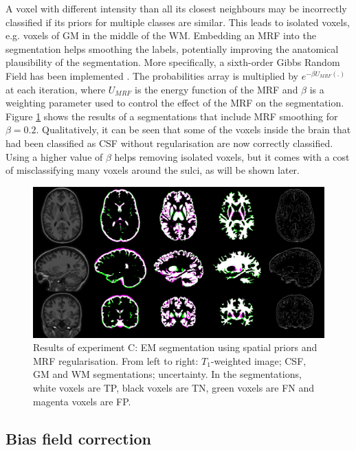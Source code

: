 A voxel with different intensity than all its closest neighbours may be incorrectly classified if its priors for multiple classes are similar. This leads to isolated voxels, e.g. voxels of GM in the middle of the WM. Embedding an MRF into the segmentation helps smoothing the labels, potentially improving the anatomical plausibility of the segmentation. More specifically, a sixth-order Gibbs Random Field has been implemented \cite{leemput_automated_1999-1}. The probabilities array is multiplied by $e^{- \beta U_{MRF}(.)}$ at each iteration, where $U_{MRF}$ is the energy function of the MRF and $\beta$ is a weighting parameter used to control the effect of the MRF on the segmentation. Figure \ref{fig:experiment-c} shows the results of a segmentations that include MRF smoothing for $\beta = 0.2$. Qualitatively, it can be seen that some of the voxels inside the brain that had been classified as CSF without regularisation are now correctly classified. Using a higher value of $\beta$ helps removing isolated voxels, but it comes with a cost of misclassifying many voxels around the sulci, as will be shown later.

\begin{figure}
  \centering
  \includegraphics[width=\textwidth]{figures/experiment_c}
  \caption{Results of experiment C: EM segmentation using spatial priors and MRF regularisation. From left to right: $T_1$-weighted image; CSF, GM and WM segmentations; uncertainty. In the segmentations, white voxels are TP, black voxels are TN, green voxels are FN and magenta voxels are FP.}
  \label{fig:experiment-c}
\end{figure}



\subsection{Bias field correction}

